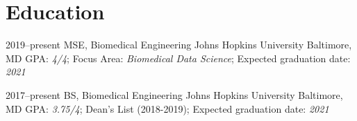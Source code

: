\section{Education}

\cventry
{2019--present}
{MSE, Biomedical Engineering}
{Johns Hopkins University}
{Baltimore, MD}
{}
{
GPA: \textit{4/4}; 
Focus Area: \textit{Biomedical Data Science}; 
Expected graduation date: \textit{2021}
}

\cventry
{2017--present}
{BS, Biomedical Engineering}
{Johns Hopkins University}
{Baltimore, MD}
{}
{
GPA: \textit{3.75/4}; 
Dean's List (2018-2019);
{Expected graduation date:} \textit{2021}
}
